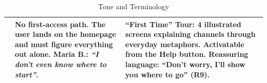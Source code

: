 \begin{table}[H]
\begin{tabular}{|p{0.5cm}|p{7cm}|p{7cm}|}
\raisebox{0.5cm}{\rotatebox{90}{\textbf{Onboarding}}} &
No first-access path. The user lands on the homepage and must figure everything out alone. Maria B.: \textit{``I don't even know where to start''}. &
\textbf{``First Time'' Tour}: 4 illustrated screens explaining channels through everyday metaphors. Activatable from the Help button. Reassuring language: ``Don't worry, I'll show you where to go'' (R9). \\ \hline
\end{tabular}
\caption{Tone and Terminology}
\label{tab:comparison-tone}
\end{table}





